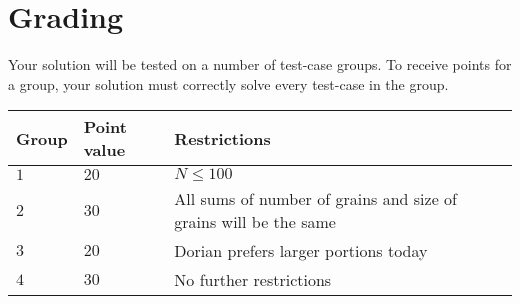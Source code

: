 \section*{Grading}
\noindent
Your solution will be tested on a number of test-case groups.
\noindent
To receive points for a group, your solution must correctly solve every test-case in the group.

\noindent
\begin{tabular}{| l | l | l |}
\hline
  Group & Point value & Restrictions \\ \hline
  $1$    & $20$       &  $N \leq 100$  \\ \hline 
  $2$    & $30$       &  All sums of number of grains and size of grains will be the same \\ \hline 
  $3$    & $20$       &  Dorian prefers larger portions today \\ \hline
  $4$    & $30$       &  No further restrictions \\ \hline
\end{tabular}